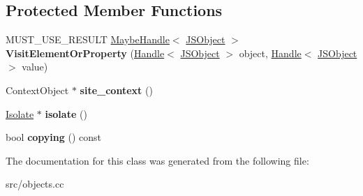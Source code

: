 \subsection*{Protected Member Functions}
\begin{DoxyCompactItemize}
\item 
\hypertarget{classv8_1_1internal_1_1_j_s_object_walk_visitor_ac1373180cf7b13ce74dffd40017a151d}{}M\+U\+S\+T\+\_\+\+U\+S\+E\+\_\+\+R\+E\+S\+U\+L\+T \hyperlink{classv8_1_1internal_1_1_maybe_handle}{Maybe\+Handle}$<$ \hyperlink{classv8_1_1internal_1_1_j_s_object}{J\+S\+Object} $>$ {\bfseries Visit\+Element\+Or\+Property} (\hyperlink{classv8_1_1internal_1_1_handle}{Handle}$<$ \hyperlink{classv8_1_1internal_1_1_j_s_object}{J\+S\+Object} $>$ object, \hyperlink{classv8_1_1internal_1_1_handle}{Handle}$<$ \hyperlink{classv8_1_1internal_1_1_j_s_object}{J\+S\+Object} $>$ value)\label{classv8_1_1internal_1_1_j_s_object_walk_visitor_ac1373180cf7b13ce74dffd40017a151d}

\item 
\hypertarget{classv8_1_1internal_1_1_j_s_object_walk_visitor_a7fd73991b906bb9d452b20b43c4c4c2f}{}Context\+Object $\ast$ {\bfseries site\+\_\+context} ()\label{classv8_1_1internal_1_1_j_s_object_walk_visitor_a7fd73991b906bb9d452b20b43c4c4c2f}

\item 
\hypertarget{classv8_1_1internal_1_1_j_s_object_walk_visitor_a9628537ba61aceb5eaa1200d2134a1d8}{}\hyperlink{classv8_1_1internal_1_1_isolate}{Isolate} $\ast$ {\bfseries isolate} ()\label{classv8_1_1internal_1_1_j_s_object_walk_visitor_a9628537ba61aceb5eaa1200d2134a1d8}

\item 
\hypertarget{classv8_1_1internal_1_1_j_s_object_walk_visitor_abc243d3fe9e1311bacd36219f65b4ceb}{}bool {\bfseries copying} () const \label{classv8_1_1internal_1_1_j_s_object_walk_visitor_abc243d3fe9e1311bacd36219f65b4ceb}

\end{DoxyCompactItemize}


The documentation for this class was generated from the following file\+:\begin{DoxyCompactItemize}
\item 
src/objects.\+cc\end{DoxyCompactItemize}
